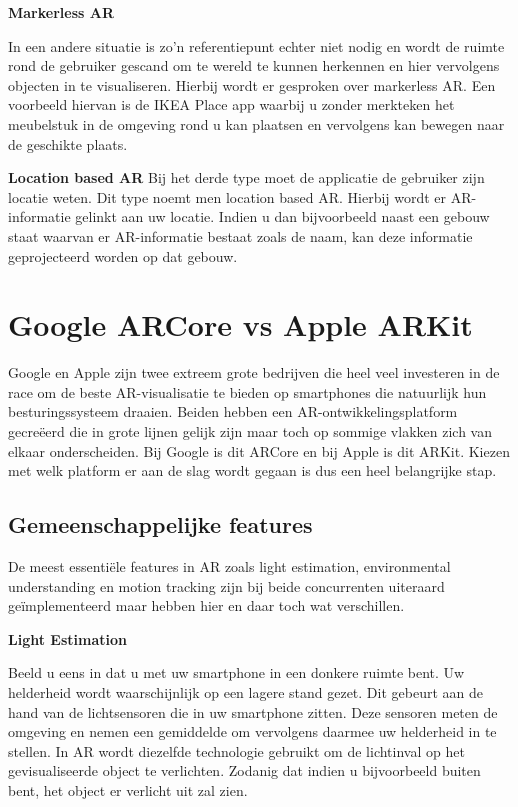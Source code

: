 \textbf{Markerless AR}

In een andere situatie is zo'n referentiepunt echter niet nodig en wordt de ruimte rond de gebruiker gescand om te wereld te kunnen herkennen en hier vervolgens objecten in te visualiseren. Hierbij wordt er gesproken over markerless AR. Een voorbeeld hiervan is de IKEA Place app waarbij u zonder merkteken het meubelstuk in de omgeving rond u kan plaatsen en vervolgens kan bewegen naar de geschikte plaats.

\textbf{Location based AR}
Bij het derde type moet de applicatie de gebruiker zijn locatie weten. Dit type noemt men location based AR. Hierbij wordt er AR-informatie gelinkt aan uw locatie. Indien u dan bijvoorbeeld naast een gebouw staat waarvan er AR-informatie bestaat zoals de naam, kan deze informatie geprojecteerd worden op dat gebouw. 



\section{Google ARCore vs Apple ARKit}
\label{sec:google-arcore-vs-apple-arkit}

Google en Apple zijn twee extreem grote bedrijven die heel veel investeren in de race om de beste AR-visualisatie te bieden op smartphones die natuurlijk hun besturingssysteem draaien. Beiden hebben een AR-ontwikkelingsplatform gecreëerd die in grote lijnen gelijk zijn maar toch op sommige vlakken zich van elkaar onderscheiden. Bij Google is dit ARCore en bij Apple is dit ARKit. Kiezen met welk platform er aan de slag wordt gegaan is dus een heel belangrijke stap. 

\subsection{Gemeenschappelijke features}

De meest essentiële features in AR zoals light estimation, environmental understanding en motion tracking zijn bij beide concurrenten uiteraard geïmplementeerd maar hebben hier en daar toch wat verschillen. 

\textbf{Light Estimation}

Beeld u eens in dat u met uw smartphone in een donkere ruimte bent. Uw helderheid wordt waarschijnlijk op een lagere stand gezet. Dit gebeurt aan de hand van de lichtsensoren die in uw smartphone zitten. Deze sensoren meten de omgeving en nemen een gemiddelde om vervolgens daarmee uw helderheid in te stellen. In AR wordt diezelfde technologie gebruikt om de lichtinval op het gevisualiseerde object te verlichten. Zodanig dat indien u bijvoorbeeld buiten bent, het object er verlicht uit zal zien.

